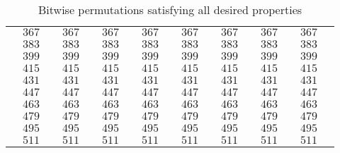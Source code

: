 \begin{table}[h]
\begin{tabular}{l|l|l|l|l|l|l|l|l|l|l|l|l|l|l|l|l}
&  $367$ &      &  $367$ &      &  $367$ &      &  $367$ &      &  $367$ &      &  $367$ &      &  $367$ &      &  $367$ &      \\
&  $383$ &      &  $383$ &      &  $383$ &      &  $383$ &      &  $383$ &      &  $383$ &      &  $383$ &      &  $383$ &      \\
&  $399$ &      &  $399$ &      &  $399$ &      &  $399$ &      &  $399$ &      &  $399$ &      &  $399$ &      &  $399$ &      \\
&  $415$ &      &  $415$ &      &  $415$ &      &  $415$ &      &  $415$ &      &  $415$ &      &  $415$ &      &  $415$ &      \\
&  $431$ &      &  $431$ &      &  $431$ &      &  $431$ &      &  $431$ &      &  $431$ &      &  $431$ &      &  $431$ &      \\
&  $447$ &      &  $447$ &      &  $447$ &      &  $447$ &      &  $447$ &      &  $447$ &      &  $447$ &      &  $447$ &      \\
&  $463$ &      &  $463$ &      &  $463$ &      &  $463$ &      &  $463$ &      &  $463$ &      &  $463$ &      &  $463$ &      \\
&  $479$ &      &  $479$ &      &  $479$ &      &  $479$ &      &  $479$ &      &  $479$ &      &  $479$ &      &  $479$ &      \\
&  $495$ &      &  $495$ &      &  $495$ &      &  $495$ &      &  $495$ &      &  $495$ &      &  $495$ &      &  $495$ &      \\
&  $511$ &      &  $511$ &      &  $511$ &      &  $511$ &      &  $511$ &      &  $511$ &      &  $511$ &      &  $511$ &      \\
\end{tabular}
\caption{Bitwise permutations satisfying all desired properties}
\label{tab:BitwisePermutations}
\end{table}
